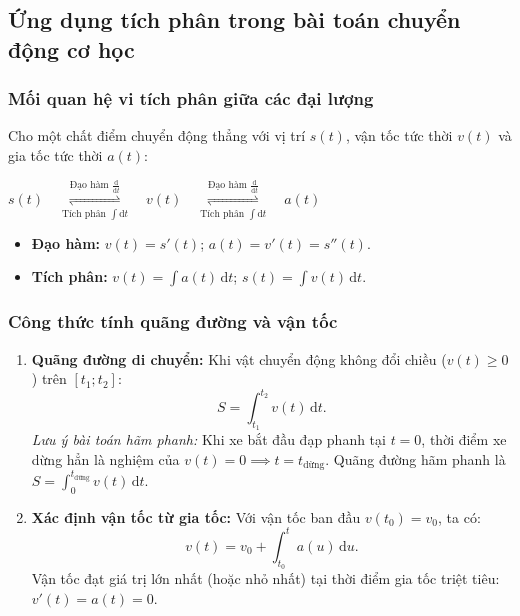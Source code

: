 \documentclass[12pt]{article}
\begin{document}
	\subsection{Ứng dụng tích phân trong bài toán chuyển động cơ học}
	
	\subsubsection{Mối quan hệ vi tích phân giữa các đại lượng}
	
	Cho một chất điểm chuyển động thẳng với vị trí $s(t)$, vận tốc tức thời $v(t)$ và gia tốc tức thời $a(t)$:
	\begin{center}
		\begin{tcolorbox}[colback=gray!6!white, colframe=gray!60!black, width=0.85\linewidth, halign=center, arc=2mm]
			$s(t) \quad \overset{\text{Đạo hàm } \frac{\mathrm{d}}{\mathrm{d}t}}{\underset{\text{Tích phân } \int \mathrm{d}t}{\rightleftharpoons}} \quad v(t) \quad \overset{\text{Đạo hàm } \frac{\mathrm{d}}{\mathrm{d}t}}{\underset{\text{Tích phân } \int \mathrm{d}t}{\rightleftharpoons}} \quad a(t)$
		\end{tcolorbox}
	\end{center}
	\begin{itemize}[itemsep=2pt, topsep=2pt]
		\item \textbf{Đạo hàm:} $v(t) = s'(t)$; \quad $a(t) = v'(t) = s''(t)$.
		\item \textbf{Tích phân:} $v(t) = \displaystyle \int a(t)\,\mathrm{d}t$; \quad $s(t) = \displaystyle \int v(t)\,\mathrm{d}t$.
	\end{itemize}
	
	\subsubsection{Công thức tính quãng đường và vận tốc}
	
	\begin{enumerate}[label=\textbf{\arabic*.}]
		\item \textbf{Quãng đường di chuyển:} Khi vật chuyển động không đổi chiều ($v(t) \ge 0$) trên $[t_1; t_2]$:
		\[
		S = \int_{t_1}^{t_2} v(t)\,\mathrm{d}t.
		\]
		\textit{Lưu ý bài toán hãm phanh:} Khi xe bắt đầu đạp phanh tại $t = 0$, thời điểm xe dừng hẳn là nghiệm của $v(t) = 0 \implies t = t_{\text{dừng}}$. Quãng đường hãm phanh là $S = \displaystyle \int_0^{t_{\text{dừng}}} v(t)\,\mathrm{d}t$.
		
		\item \textbf{Xác định vận tốc từ gia tốc:} Với vận tốc ban đầu $v(t_0) = v_0$, ta có:
		\[
		v(t) = v_0 + \int_{t_0}^t a(u)\,\mathrm{d}u.
		\]
		Vận tốc đạt giá trị lớn nhất (hoặc nhỏ nhất) tại thời điểm gia tốc triệt tiêu: $v'(t) = a(t) = 0$.
	\end{enumerate}
	
\end{document}
